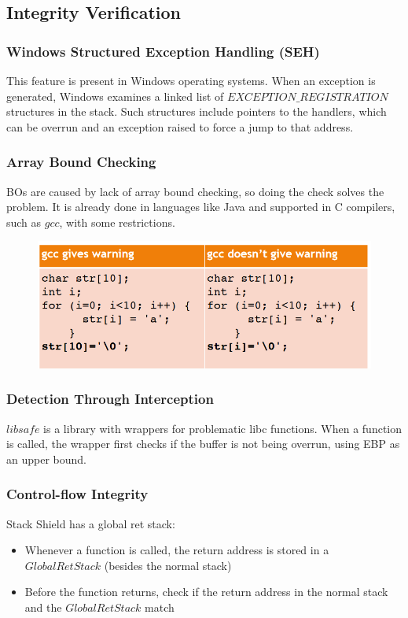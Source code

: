 \documentclass[10pt,a4paper]{report}
\begin{document}
\subsection{Integrity Verification}
\subsubsection{Windows Structured Exception Handling (SEH)}
This feature is present in Windows operating systems. When an exception is generated, Windows examines a linked list of $EXCEPTION\_REGISTRATION$ structures in the stack. Such structures include pointers to the handlers, which  can be overrun and an exception raised to force a jump to that address.
\subsubsection{Array Bound Checking}
BOs are caused by lack of array bound checking, so doing the check solves the problem. It is already done in languages like Java and supported in C compilers, such as $gcc$, with some restrictions.
\begin{figure}[H]
\centering
\includegraphics[scale=0.4]{16.png}
\end{figure}
\subsubsection{Detection Through Interception}
$libsafe$ is a library with wrappers for problematic libc functions. When a function is called, the wrapper first checks if the buffer is not being overrun, using EBP as an upper bound.
\subsubsection{Control-flow Integrity}
Stack Shield has a global ret stack:
\begin{itemize}
\item Whenever a function is called, the return address is stored in a $GlobalRetStack$ (besides the normal stack)
\item Before the function returns, check if the return address in the normal stack and the $GlobalRetStack$ match
\end{itemize}
\end{document}
